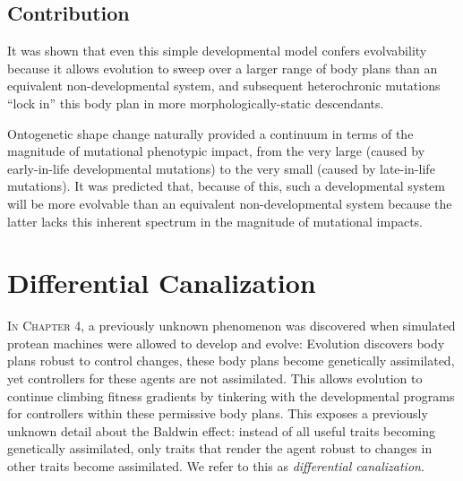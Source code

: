 \subsection{Contribution}


It was shown that even this simple developmental model confers evolvability 
because it allows evolution to sweep over a larger range of body plans than an equivalent non-developmental system, and subsequent heterochronic mutations
``lock in'' this body plan in more morphologically-static descendants.

Ontogenetic shape change
naturally provided
a continuum in terms of the magnitude of mutational phenotypic impact,
from the very large (caused by early-in-life developmental mutations) 
to the very small (caused by late-in-life mutations). 
It was predicted that,
because of this, such a developmental system will be more evolvable than an equivalent non-developmental system because the latter lacks this inherent spectrum in the magnitude of mutational impacts.



\section{Differential Canalization}

\textsc{In Chapter 4,}
a previously unknown phenomenon was discovered when simulated protean machines were allowed to develop and evolve: 
Evolution discovers body plans robust to control changes, these body plans become genetically assimilated, yet controllers for these agents are not assimilated. 
This allows evolution to continue climbing fitness gradients by tinkering with the developmental programs for controllers within these permissive body plans. 
This exposes a previously unknown detail about the Baldwin effect: instead of all useful traits becoming genetically assimilated, only traits that render the agent robust to changes in other traits become assimilated. 
We refer to this as \textit{differential canalization}.


